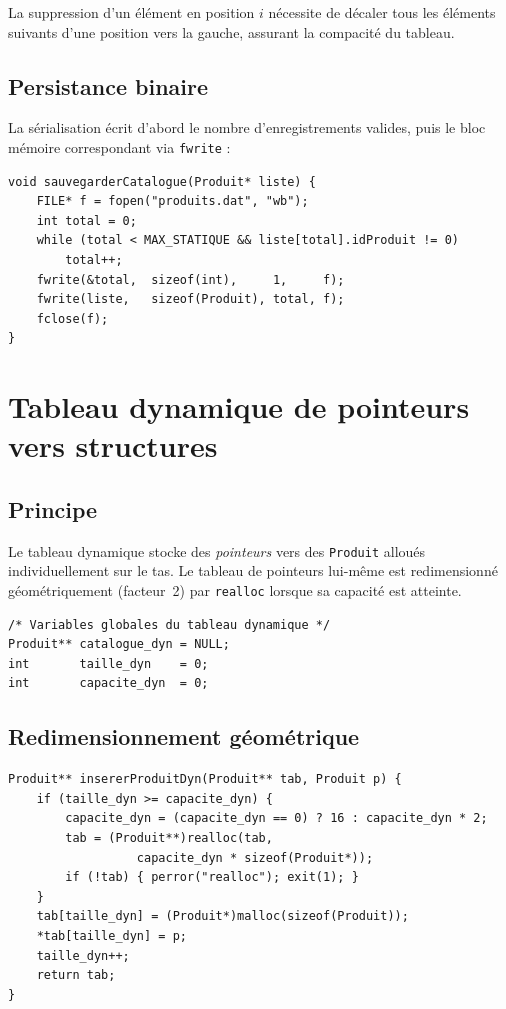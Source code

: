 \documentclass[12pt,a4paper]{report}
\begin{document}
La suppression d'un élément en position $i$ nécessite de décaler tous les éléments suivants d'une position vers la gauche, assurant la compacité du tableau.

\subsection{Persistance binaire}

La sérialisation écrit d'abord le nombre d'enregistrements valides, puis le bloc mémoire correspondant via \texttt{fwrite} :

\begin{lstlisting}[caption={Sérialisation binaire du catalogue}]
void sauvegarderCatalogue(Produit* liste) {
    FILE* f = fopen("produits.dat", "wb");
    int total = 0;
    while (total < MAX_STATIQUE && liste[total].idProduit != 0)
        total++;
    fwrite(&total,  sizeof(int),     1,     f);
    fwrite(liste,   sizeof(Produit), total, f);
    fclose(f);
}
\end{lstlisting}

\section{Tableau dynamique de pointeurs vers structures}

\subsection{Principe}

Le tableau dynamique stocke des \emph{pointeurs} vers des \texttt{Produit} alloués individuellement sur le tas. Le tableau de pointeurs lui-même est redimensionné géométriquement (facteur~2) par \texttt{realloc} lorsque sa capacité est atteinte.

\begin{lstlisting}[caption={Structure interne du tableau dynamique}]
/* Variables globales du tableau dynamique */
Produit** catalogue_dyn = NULL;
int       taille_dyn    = 0;
int       capacite_dyn  = 0;
\end{lstlisting}

\subsection{Redimensionnement géométrique}

\begin{lstlisting}[caption={Insertion avec realloc (facteur ×2)}, label=lst:insert_dyn]
Produit** insererProduitDyn(Produit** tab, Produit p) {
    if (taille_dyn >= capacite_dyn) {
        capacite_dyn = (capacite_dyn == 0) ? 16 : capacite_dyn * 2;
        tab = (Produit**)realloc(tab,
                  capacite_dyn * sizeof(Produit*));
        if (!tab) { perror("realloc"); exit(1); }
    }
    tab[taille_dyn] = (Produit*)malloc(sizeof(Produit));
    *tab[taille_dyn] = p;
    taille_dyn++;
    return tab;
}
\end{lstlisting}
\end{document}
